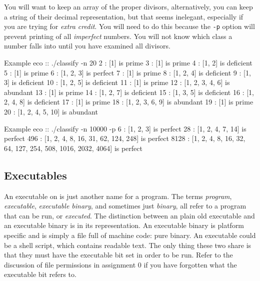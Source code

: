 You will want to keep an array of the proper divisors, alternatively,
you can keep a string of their decimal representation, but that seems inelegant, especially if you are trying for \emph{extra credit}. You will need to
do this because the \texttt{-p} option will prevent printing of all
\emph{imperfect} numbers. You will not know which class a number
falls into until you have examined all divisors.

\begin{shlisting}{Example}
eco :: ./classify -n 20
2 : [1] is prime
3 : [1] is prime
4 : [1, 2] is deficient
5 : [1] is prime
6 : [1, 2, 3] is perfect
7 : [1] is prime
8 : [1, 2, 4] is deficient
9 : [1, 3] is deficient
10 : [1, 2, 5] is deficient
11 : [1] is prime
12 : [1, 2, 3, 4, 6] is abundant
13 : [1] is prime
14 : [1, 2, 7] is deficient
15 : [1, 3, 5] is deficient
16 : [1, 2, 4, 8] is deficient
17 : [1] is prime
18 : [1, 2, 3, 6, 9] is abundant
19 : [1] is prime
20 : [1, 2, 4, 5, 10] is abundant
\end{shlisting}

\begin{shlisting}{Example}
eco :: ./classify -n 10000 -p
6 : [1, 2, 3] is perfect
28 : [1, 2, 4, 7, 14] is perfect
496 : [1, 2, 4, 8, 16, 31, 62, 124, 248] is perfect
8128 : [1, 2, 4, 8, 16, 32, 64, 127, 254, 508, 1016, 2032, 4064] is perfect
\end{shlisting}

\subsection{Executables}

An executable on \Unix{} is just another name for a program. The terms
\emph{program}, \emph{executable}, \emph{executable binary}, and sometimes just
\emph{binary}, all refer to a program that can be run, or \emph{executed}. The
distinction between an plain old executable and an executable binary is in its
representation. An executable binary is platform specific and is simply a file
full of machine code: pure binary. An executable could be a shell script, which
contains readable text. The only thing these two share is that they must have
the executable bit set in order to be run. Refer to the discussion of \Unix{}
file permissions in assignment 0 if you have forgotten what the executable bit
refers to.
